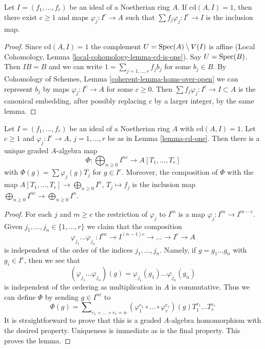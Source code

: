 \begin{lemma}
\label{lemma-cd-one}
Let $I = (f_1, \ldots, f_r)$ be an ideal of a Noetherian ring $A$.
If $\text{cd}(A, I) = 1$, then there exist $c \geq 1$ and maps
$\varphi_j : I^c \to A$ such that $\sum f_j \varphi_j : I^c \to I$
is the inclusion map.
\end{lemma}

\begin{proof}
Since $\text{cd}(A, I) = 1$ the complement $U = \mathop{\mathrm{Spec}}(A) \setminus V(I)$
is affine (Local Cohomology, Lemma \ref{local-cohomology-lemma-cd-is-one}).
Say $U = \mathop{\mathrm{Spec}}(B)$. Then $IB = B$
and we can write $1 = \sum_{j = 1, \ldots, r} f_j b_j$
for some $b_j \in B$. By
Cohomology of Schemes, Lemma \ref{coherent-lemma-homs-over-open}
we can represent $b_j$ by maps $\varphi_j : I^c \to A$
for some $c \geq 0$. Then $\sum f_j \varphi_j : I^c \to I \subset A$
is the canonical embedding, after possibly replacing $c$ by a larger
integer, by the same lemma.
\end{proof}

\begin{lemma}
\label{lemma-cd-one-extend}
Let $I = (f_1, \ldots, f_r)$ be an ideal of a Noetherian ring $A$
with $\text{cd}(A, I) = 1$. Let $c \geq 1$ and $\varphi_j : I^c \to A$,
$j = 1, \ldots, r$ be as in Lemma \ref{lemma-cd-one}.
Then there is a unique graded $A$-algebra map
$$
\Phi : \bigoplus\nolimits_{n \geq 0} I^{nc} \to A[T_1, \ldots, T_r]
$$
with $\Phi(g) = \sum \varphi_j(g) T_j$ for $g \in I^c$.
Moreover, the composition of $\Phi$ with the map
$A[T_1, \ldots, T_r] \to \bigoplus_{n \geq 0} I^n$,
$T_j \mapsto f_j$ is the inclusion map
$\bigoplus_{n \geq 0} I^{nc} \to \bigoplus_{n \geq 0} I^n$.
\end{lemma}

\begin{proof}
For each $j$ and $m \geq c$ the restriction of $\varphi_j$ to
$I^m$ is a map $\varphi_j : I^m \to I^{m - c}$.
Given $j_1, \ldots, j_n \in \{1, \ldots, r\}$ we claim that the
composition
$$
\varphi_{j_1} \ldots \varphi_{j_n} :
I^{nc} \to I^{(n - 1)c} \to \ldots \to I^c \to A
$$
is independent of the order of the indices $j_1, \ldots, j_n$.
Namely, if $g = g_1 \ldots g_n$ with $g_i \in I^c$, then
we see that
$$
(\varphi_{j_1} \ldots \varphi_{j_n})(g) =
\varphi_{j_1}(g_1) \ldots \varphi_{j_n}(g_n)
$$
is independent of the ordering as multiplication in $A$ is commutative.
Thus we can define $\Phi$ by sending $g \in I^{nc}$ to
$$
\Phi(g) = \sum\nolimits_{e_1 + \ldots + e_r = n}
(\varphi_1^{e_1} \circ \ldots \circ \varphi_r^{e_r})(g)
T_1^{e_1} \ldots T_r^{e_r}
$$
It is straightforward to prove that this is a graded $A$-algebra
homomorphism with the desired property. Uniqueness is immediate
as is the final property. This proves the lemma.
\end{proof}

